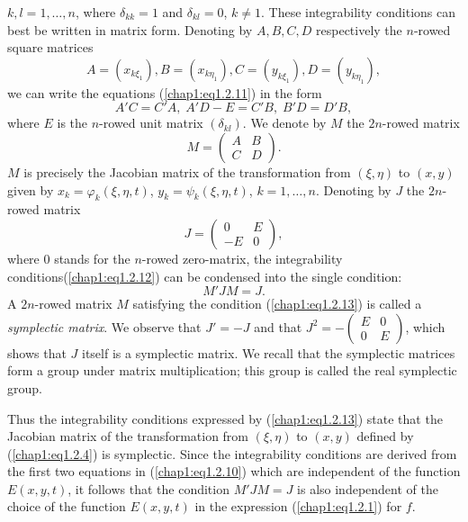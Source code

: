 $k,l = 1, \ldots ,n$, where $\delta_{kk} =1$ and $\delta_{kl} = 0$, $k \neq 1$. These integrability conditions can best be written in matrix form. Denoting by $A,B,C,D$ respectively the $n$-rowed square matrices
$$
A = (x_{k\xi_1}), B= (x_{k\eta_1}) , C= (y_{k\xi_1}), D = (y_{k\eta_1}), 
$$
we can write the equations (\ref{chap1:eq1.2.11}) in the form
\begin{equation*}
A' C= C' A, \; A'D - E = C' B, \; B'D = D' B, \tag{1.2.12}\label{chap1:eq1.2.12}
\end{equation*}
where $E$ is the $n$-rowed unit matrix $(\delta_{kl})$. We denote by $M$ the $2n$-rowed matrix
$$
M = \begin{pmatrix}
A & B\\
C & D
\end{pmatrix}. 
$$
$M$ is precisely the Jacobian matrix of the transformation from $(\xi, \eta)$ to $(x,y)$ given by $x_k = \varphi_k(\xi, \eta, t)$, $y_k = \psi_k(\xi, \eta, t)$, $k = 1, \ldots, n$. Denoting by $J$ the $2n$-rowed matrix
$$
J = 
\begin{pmatrix}
0 & E \\
-E & 0
\end{pmatrix},
$$
where $0$ stands for the $n$-rowed zero-matrix, the integrability conditions\pageoriginale  (\ref{chap1:eq1.2.12}) can be condensed into the single condition:
\begin{equation*}
M' J M = J. \tag{1.2.13}\label{chap1:eq1.2.13}
\end{equation*}
A $2n$-rowed matrix $M$ satisfying the condition (\ref{chap1:eq1.2.13}) is called a {\em symplectic matrix}. We observe that $J' = - J$ and that $J^2 = - \begin{pmatrix}
E & 0\\
0 & E
\end{pmatrix}$, which shows that $J$ itself is a symplectic matrix. We recall that the symplectic matrices form a group under matrix multiplication; this group is called the real symplectic group.

Thus the integrability conditions expressed by (\ref{chap1:eq1.2.13}) state that the Jacobian matrix of the transformation from $(\xi, \eta)$ to $(x,y)$ defined by (\ref{chap1:eq1.2.4}) is symplectic. Since the integrability conditions are derived from the first two equations in (\ref{chap1:eq1.2.10}) which are independent of the function $E(x,y,t)$, it follows that the condition $M' J M = J$ is also independent of the choice of the function $E(x, y, t)$ in the expression (\ref{chap1:eq1.2.1}) for $f$.

